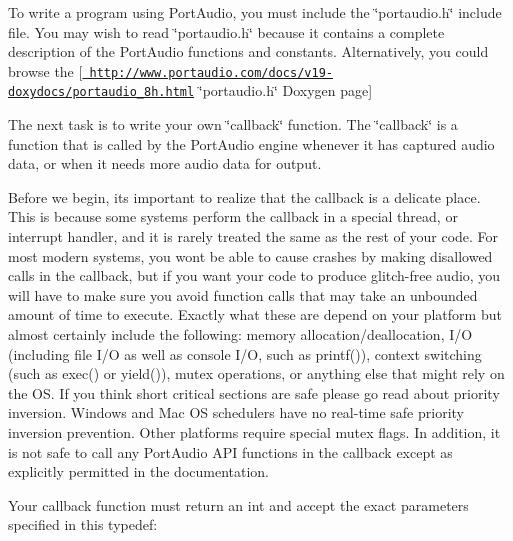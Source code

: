 To write a program using Port\+Audio, you must include the \char`\"{}portaudio.\+h\char`\"{} include file. You may wish to read \char`\"{}portaudio.\+h\char`\"{} because it contains a complete description of the Port\+Audio functions and constants. Alternatively, you could browse the \mbox{[}\href{http://www.portaudio.com/docs/v19-doxydocs/portaudio_8h.html}{\texttt{ http\+://www.\+portaudio.\+com/docs/v19-\/doxydocs/portaudio\+\_\+8h.\+html}} \char`\"{}portaudio.\+h\char`\"{} Doxygen page\mbox{]} 
\begin{DoxyCode}{0}

\end{DoxyCode}
 The next task is to write your own \char`\"{}callback\char`\"{} function. The \char`\"{}callback\char`\"{} is a function that is called by the Port\+Audio engine whenever it has captured audio data, or when it needs more audio data for output.

Before we begin, it\textquotesingle{}s important to realize that the callback is a delicate place. This is because some systems perform the callback in a special thread, or interrupt handler, and it is rarely treated the same as the rest of your code. For most modern systems, you won\textquotesingle{}t be able to cause crashes by making disallowed calls in the callback, but if you want your code to produce glitch-\/free audio, you will have to make sure you avoid function calls that may take an unbounded amount of time to execute. Exactly what these are depend on your platform but almost certainly include the following\+: memory allocation/deallocation, I/O (including file I/O as well as console I/O, such as printf()), context switching (such as exec() or yield()), mutex operations, or anything else that might rely on the OS. If you think short critical sections are safe please go read about priority inversion. Windows and Mac OS schedulers have no real-\/time safe priority inversion prevention. Other platforms require special mutex flags. In addition, it is not safe to call any Port\+Audio API functions in the callback except as explicitly permitted in the documentation.

Your callback function must return an int and accept the exact parameters specified in this typedef\+:


